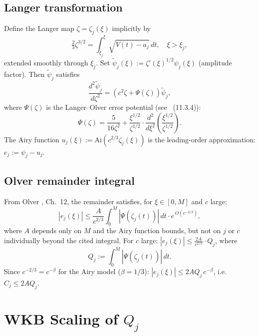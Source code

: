 \documentclass[12pt,a4paper]{amsart}
\theoremstyle{definition}
\newcommand{\Ai}{\mathrm{Ai}}
\begin{document}
\subsection{Langer transformation}
Define the Langer map $\zeta = \zeta_j(\xi)$ implicitly by
\begin{equation}\label{eq:langer_map}
  \tfrac{2}{3}\zeta^{3/2} = \int_{\xi_j}^\xi \sqrt{V(t)-a_j}\,dt,
  \quad \xi > \xi_j,
\end{equation}
extended smoothly through $\xi_j$. Set
$\tilde\psi_j(\xi) := \zeta'(\xi)^{1/2}\psi_j(\xi)$
(amplitude factor). Then $\tilde\psi_j$ satisfies
\begin{equation}\label{eq:transformed}
  \frac{d^2\tilde\psi_j}{d\zeta^2}
  = \left(c^2\zeta + \Psi(\zeta)\right)\tilde\psi_j,
\end{equation}
where $\Psi(\zeta)$ is the Langer--Olver error potential
(see~\cite{Olver1997} (11.3.4)):
\begin{equation}\label{eq:Psi}
  \Psi(\zeta) = \frac{5}{16\zeta^2} + \frac{\xi^{1/2}}{\zeta^{1/2}}
    \cdot\frac{d^2}{d\xi^2}\left(\frac{\xi^{1/2}}{\zeta^{1/2}}\right).
\end{equation}
The Airy function $u_j(\xi) := \Ai(c^{2/3}\zeta_j(\xi))$
is the leading-order approximation:
$e_j := \psi_j - u_j$.

\subsection{Olver remainder integral}
From Olver \cite{Olver1997}, Ch.~12, the remainder satisfies,
for $\xi\in[0,M]$ and $c$ large:
\begin{equation}\label{eq:olver_remainder}
  |e_j(\xi)| \leq \frac{A}{c^{2/3}}
    \int_0^M |\Psi(\zeta_j(t))|\,dt\cdot e^{\,O(c^{-2/3})},
\end{equation}
where $A$ depends only on $M$ and the Airy function bounds,
but not on $j$ or $c$ individually beyond the cited integral.
For $c$ large: $|e_j(\xi)| \leq \frac{2A}{c^{2/3}}\cdot Q_j$,
where
\begin{equation}\label{eq:Qj}
  Q_j := \int_0^M |\Psi(\zeta_j(t))|\,dt.
\end{equation}
Since $c^{-2/3} = c^{-\beta}$ for the Airy model ($\beta=1/3$):
$|e_j(\xi)| \leq 2AQ_j\,c^{-\beta}$, i.e.\ $C_j \leq 2AQ_j$.

\section{WKB Scaling of $Q_j$}
\label{sec:wkb}
\end{document}
